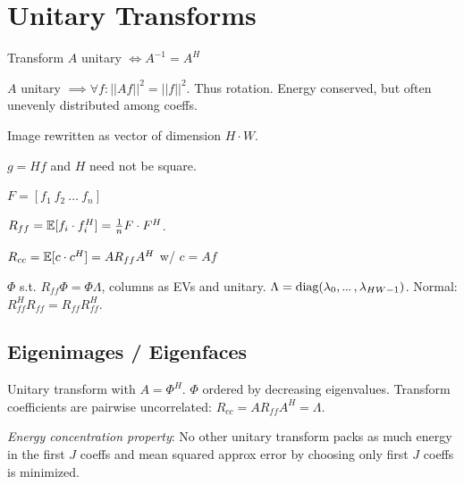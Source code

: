 \section{Unitary Transforms}

\begin{definition}
  Transform \(A\) unitary \(\iff A^{-1} = A^H\)
\end{definition}

\begin{theorem}
  \(A\) unitary \(\implies \forall f: ||Af||^2 = ||f||^2\).
  Thus rotation. Energy conserved, but often unevenly distributed among coeffs.
\end{theorem}

\begin{definition}[Vectorization]
  Image rewritten as vector of dimension \(H \cdot W\). 
\end{definition}

\begin{definition}
  \(g = Hf\) and \(H\) need not be square.
\end{definition}

\begin{definition}
  \(F = [f_1 \ f_2 \ \ldots \ f_n]\)
\end{definition}

\begin{definition}
  \(R_{ff} = \operatorname{\mathbb{E}}[f_i \cdot f_i^H] = \frac{1}{n} F \cdot F^H\). 
\end{definition}

\begin{definition}
  \(R_{cc} = \operatorname{\mathbb{E}}[c \cdot c^H] = A R_{ff} A^H\) w/ \(c = Af\)
\end{definition}

\begin{definition}[Eigenmatrix of \(R_{ff}\)]
  \(\Phi\) s.t. \(R_{ff}\Phi = \Phi \Lambda\), columns as EVs and unitary.
  \(\Lambda = \text{diag}(\lambda_0, \sdots, \lambda_{HW - 1})\).
  Normal: \(R_{ff}^HR_{ff} = R_{ff}R_{ff}^H\).
\end{definition}

\subsection{Eigenimages / Eigenfaces}

\begin{algorithm}
  Unitary transform with \(A = \Phi^H\).
  \(\Phi\) ordered by decreasing eigenvalues. Transform coefficients are pairwise uncorrelated: \(R_{cc} = AR_{ff}A^H = \Lambda\).

  \textit{Energy concentration property}: No other unitary transform packs as much energy in the first \(J\) coeffs and mean squared approx error by choosing only first \(J\) coeffs is minimized.
\end{algorithm}

